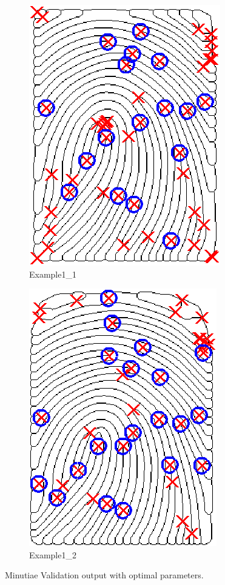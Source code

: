 \documentclass[11pt]{article}
\begin{document}
\begin{figure}[h!]
  \centering
       \begin{subfigure}[t]{0.45\textwidth}
         \centering
         \includegraphics[scale=0.85]{img/ext_val_optim_1}
         \caption{Example1\_1}
     \end{subfigure}%
     \quad
     \begin{subfigure}[t]{0.45\textwidth}
         \centering
         \includegraphics[scale=0.85]{img/ext_val_optim_2}
         \caption{Example1\_2}
     \end{subfigure}
    \caption{Minutiae Validation output with optimal parameters.}
    \label{fig:ex6b}
\end{figure}
\end{document}
